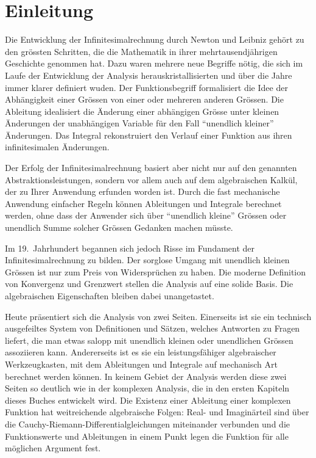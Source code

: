 %
%
%
\chapter{Einleitung
\label{chapter:einleitung}}

Die Entwicklung der Infinitesimalrechnung durch Newton und Leibniz
gehört zu den grössten Schritten, die die Mathematik in ihrer
mehrtausendjährigen Geschichte genommen hat.
Dazu waren mehrere neue Begriffe nötig, die sich im Laufe der
Entwicklung der Analysis herauskristallisierten und über die
Jahre immer klarer definiert wuden.
Der Funktionsbegriff formalisiert die Idee der Abhängigkeit einer
Grössen von einer oder mehreren anderen Grössen.
%
Die Ableitung idealisiert die Änderung einer abhängigen Grösse
%
unter kleinen Änderungen der unabhängigen Variable für den Fall
``unendlich kleiner'' Änderungen.
Das Integral rekonstruiert den Verlauf einer Funktion aus ihren
%
infinitesimalen Änderungen.

Der Erfolg der Infinitesimalrechnung basiert aber nicht nur auf
den genannten Abstraktionsleistungen, sondern vor allem auch auf
dem algebraischen Kalkül, der zu Ihrer Anwendung erfunden worden ist.
Durch die fast mechanische Anwendung einfacher Regeln können 
Ableitungen und Integrale berechnet werden, ohne dass der Anwender
sich über ``unendlich kleine'' Grössen oder unendlich Summe solcher 
Grössen Gedanken machen müsste.

Im 19.~Jahrhundert begannen sich jedoch Risse im Fundament der
Infinitesimalrechnung zu bilden.
Der sorglose Umgang mit unendlich kleinen Grössen ist nur zum
Preis von Widersprüchen zu haben.
Die moderne Definition von Konvergenz und Grenzwert stellen die
Analysis auf eine solide Basis.
%
%
Die algebraischen Eigenschaften bleiben dabei unangetastet.

Heute präsentiert sich die Analysis von zwei Seiten.
Einerseits ist sie ein technisch ausgefeiltes System von Definitionen
und Sätzen, welches Antworten zu Fragen liefert, die man etwas salopp mit
unendlich kleinen oder unendlichen Grössen assoziieren kann.
Andererseits ist es sie ein leistungsfähiger algebraischer Werkzeugkasten,
mit dem Ableitungen und Integrale auf mechanisch Art berechnet werden
können.
In keinem Gebiet der Analysis werden diese zwei Seiten so deutlich
wie in der komplexen Analysis, die in den ersten Kapiteln dieses
Buches entwickelt wird.
Die Existenz einer Ableitung einer komplexen Funktion hat weitreichende
algebraische Folgen: Real- und Imaginärteil sind über die
Cauchy-Riemann-Differentialgleichungen miteinander verbunden und
%
die Funktionswerte und Ableitungen in einem Punkt legen die Funktion
für alle möglichen Argument fest.

